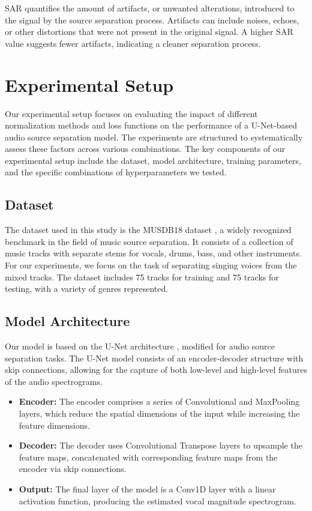 \documentclass[conference]{IEEEtran}
\begin{document}
SAR quantifies the amount of artifacts, or unwanted alterations, introduced to the signal by the source separation process. Artifacts can include noises, echoes, or other distortions that were not present in the original signal. A higher SAR value suggests fewer artifacts, indicating a cleaner separation process. 


\section{Experimental Setup}

Our experimental setup focuses on evaluating the impact of different normalization methods and loss functions on the performance of a U-Net-based audio source separation model. The experiments are structured to systematically assess these factors across various combinations. The key components of our experimental setup include the dataset, model architecture, training parameters, and the specific combinations of hyperparameters we tested.

\subsection{Dataset}

The dataset used in this study is the MUSDB18 dataset \cite{musdb18}, a widely recognized benchmark in the field of music source separation. It consists of a collection of music tracks with separate stems for vocals, drums, bass, and other instruments. For our experiments, we focus on the task of separating singing voices from the mixed tracks. The dataset includes 75 tracks for training and 75 tracks for testing, with a variety of genres represented.

\subsection{Model Architecture}

Our model is based on the U-Net architecture \cite{ronneberger2015unet}, modified for audio source separation tasks. The U-Net model consists of an encoder-decoder structure with skip connections, allowing for the capture of both low-level and high-level features of the audio spectrograms.

\begin{itemize}
    \item \textbf{Encoder:} The encoder comprises a series of Convolutional and MaxPooling layers, which reduce the spatial dimensions of the input while increasing the feature dimensions.
    \item \textbf{Decoder:} The decoder uses Convolutional Transpose layers to upsample the feature maps, concatenated with corresponding feature maps from the encoder via skip connections.
    \item \textbf{Output:} The final layer of the model is a Conv1D layer with a linear activation function, producing the estimated vocal magnitude spectrogram.
\end{itemize}
\end{document}

